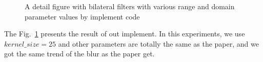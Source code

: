 \documentclass[12pt]{article}
\begin{document}
\begin{figure}[H]
  \quad
  \quad
  \quad
  \caption{A detail figure with bilateral filters with various range and domain parameter values by implement code}
  \label{im_cateye}
  \end{figure}

The Fig.~\ref{im_cateye} presents the result of out implement. In this experiments, we use $kernel\_size = 25$ and other parameters are totally the same as the paper, and we got the same trend of the blur as the paper get.
\end{document}
